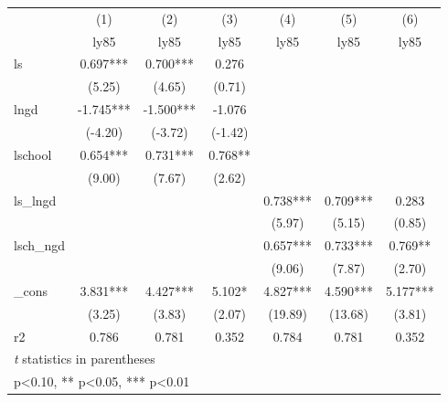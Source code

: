 {
\def\sym#1{\ifmmode^{#1}\else\(^{#1}\)\fi}
\begin{tabular}{l*{6}{c}}
\hline\hline
            &\multicolumn{1}{c}{(1)}&\multicolumn{1}{c}{(2)}&\multicolumn{1}{c}{(3)}&\multicolumn{1}{c}{(4)}&\multicolumn{1}{c}{(5)}&\multicolumn{1}{c}{(6)}\\
            &\multicolumn{1}{c}{ly85}&\multicolumn{1}{c}{ly85}&\multicolumn{1}{c}{ly85}&\multicolumn{1}{c}{ly85}&\multicolumn{1}{c}{ly85}&\multicolumn{1}{c}{ly85}\\
\hline
ls          &       0.697***&       0.700***&       0.276   &               &               &               \\
            &      (5.25)   &      (4.65)   &      (0.71)   &               &               &               \\
[1em]
lngd        &      -1.745***&      -1.500***&      -1.076   &               &               &               \\
            &     (-4.20)   &     (-3.72)   &     (-1.42)   &               &               &               \\
[1em]
lschool     &       0.654***&       0.731***&       0.768** &               &               &               \\
            &      (9.00)   &      (7.67)   &      (2.62)   &               &               &               \\
[1em]
ls\_lngd     &               &               &               &       0.738***&       0.709***&       0.283   \\
            &               &               &               &      (5.97)   &      (5.15)   &      (0.85)   \\
[1em]
lsch\_ngd    &               &               &               &       0.657***&       0.733***&       0.769** \\
            &               &               &               &      (9.06)   &      (7.87)   &      (2.70)   \\
[1em]
\_cons      &       3.831***&       4.427***&       5.102*  &       4.827***&       4.590***&       5.177***\\
            &      (3.25)   &      (3.83)   &      (2.07)   &     (19.89)   &     (13.68)   &      (3.81)   \\
\hline
r2          &       0.786   &       0.781   &       0.352   &       0.784   &       0.781   &       0.352   \\
\hline\hline
\multicolumn{7}{l}{\footnotesize \textit{t} statistics in parentheses}\\
\multicolumn{7}{l}{\footnotesize * p<0.10, ** p<0.05, *** p<0.01}\\
\end{tabular}
}
